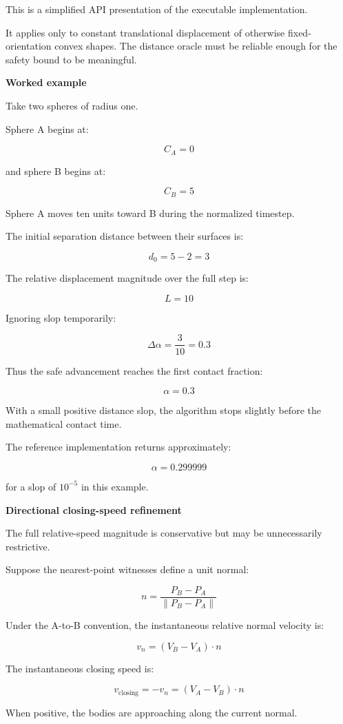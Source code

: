 This is a simplified API presentation of the executable implementation.

It applies only to constant translational displacement of otherwise fixed-orientation convex shapes. The distance oracle must be reliable enough for the safety bound to be meaningful.

\textbf{Worked example}

Take two spheres of radius one.

Sphere A begins at:

\[
C_A=0
\]

and sphere B begins at:

\[
C_B=5
\]

Sphere A moves ten units toward B during the normalized timestep.

The initial separation distance between their surfaces is:

\[
d_0=5-2=3
\]

The relative displacement magnitude over the full step is:

\[
L=10
\]

Ignoring slop temporarily:

\[
\Delta\alpha=\frac3{10}=0.3
\]

Thus the safe advancement reaches the first contact fraction:

\[
\boxed{\alpha=0.3}
\]

With a small positive distance slop, the algorithm stops slightly before the mathematical contact time.

The reference implementation returns approximately:

\[
\alpha=0.299999
\]

for a slop of \(10^{-5}\) in this example.

\textbf{Directional closing-speed refinement}

The full relative-speed magnitude is conservative but may be unnecessarily restrictive.

Suppose the nearest-point witnesses define a unit normal:

\[
n=\frac{P_B-P_A}{\|P_B-P_A\|}
\]

Under the A-to-B convention, the instantaneous relative normal velocity is:

\[
v_n=(V_B-V_A)\cdot n
\]

The instantaneous closing speed is:

\[
\boxed{ v_{\mathrm{closing}}=-v_n=(V_A-V_B)\cdot n }
\]

When positive, the bodies are approaching along the current normal.

